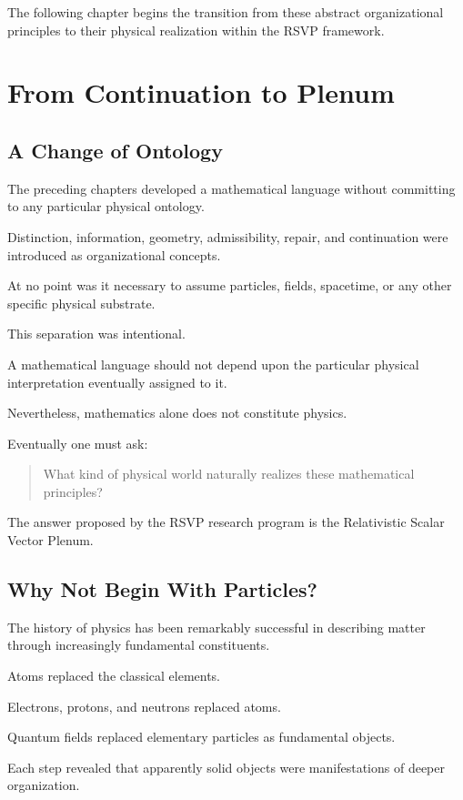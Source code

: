 \documentclass[11pt,oneside]{book}
\numberwithin{equation}{chapter}
\theoremstyle{definition}
\theoremstyle{plain}
\begin{document}
The following chapter begins the transition from these abstract
organizational principles to their physical realization within the RSVP
framework.

\chapter{From Continuation to Plenum}

\section{A Change of Ontology}

The preceding chapters developed a mathematical language without committing
to any particular physical ontology.

Distinction, information, geometry, admissibility, repair, and continuation
were introduced as organizational concepts.

At no point was it necessary to assume particles, fields, spacetime, or any
other specific physical substrate.

This separation was intentional.

A mathematical language should not depend upon the particular physical
interpretation eventually assigned to it.

Nevertheless, mathematics alone does not constitute physics.

Eventually one must ask:

\begin{quote}
What kind of physical world naturally realizes these mathematical
principles?
\end{quote}

The answer proposed by the RSVP research program is the Relativistic Scalar
Vector Plenum.

\section{Why Not Begin With Particles?}

The history of physics has been remarkably successful in describing matter
through increasingly fundamental constituents.

Atoms replaced the classical elements.

Electrons, protons, and neutrons replaced atoms.

Quantum fields replaced elementary particles as fundamental objects.

Each step revealed that apparently solid objects were manifestations of
deeper organization.
\end{document}
